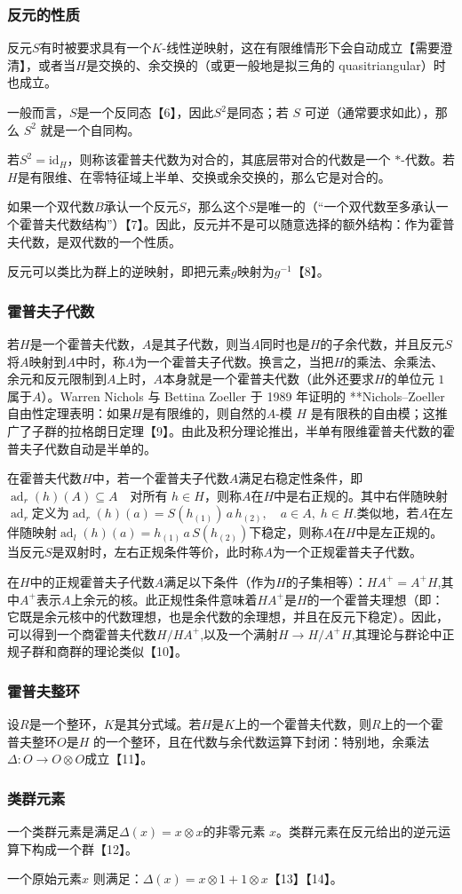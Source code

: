 \subsubsection{反元的性质}
反元$S$有时被要求具有一个$K$-线性逆映射，这在有限维情形下会自动成立【需要澄清】，或者当$H$是交换的、余交换的（或更一般地是拟三角的 quasitriangular）时也成立。

一般而言，$S$是一个反同态【6】，因此$S^2$是同态；若 $S$ 可逆（通常要求如此），那么 $S^2$ 就是一个自同构。

若$S^2 = \mathrm{id}_H$，则称该霍普夫代数为对合的，其底层带对合的代数是一个 $*$-代数。若$H$是有限维、在零特征域上半单、交换或余交换的，那么它是对合的。

如果一个双代数$B$承认一个反元$S$，那么这个$S$是唯一的（“一个双代数至多承认一个霍普夫代数结构”）【7】。因此，反元并不是可以随意选择的额外结构：作为霍普夫代数，是双代数的一个性质。

反元可以类比为群上的逆映射，即把元素$g$映射为$g^{-1}$【8】。
\subsubsection{霍普夫子代数}
若$H$是一个霍普夫代数，$A$是其子代数，则当$A$同时也是$H$的子余代数，并且反元$S$将$A$映射到$A$中时，称$A$为一个霍普夫子代数。换言之，当把$H$的乘法、余乘法、余元和反元限制到$A$上时，$A$本身就是一个霍普夫代数（此外还要求$H$的单位元 $1$属于$A$）。Warren Nichols 与 Bettina Zoeller 于 1989 年证明的 **Nichols–Zoeller 自由性定理表明：如果$H$是有限维的，则自然的$A$-模 $H$ 是有限秩的自由模；这推广了子群的拉格朗日定理【9】。由此及积分理论推出，半单有限维霍普夫代数的霍普夫子代数自动是半单的。

在霍普夫代数$H$中，若一个霍普夫子代数$A$满足右稳定性条件，即$\operatorname{ad}_r(h)(A) \subseteq A \quad \text{对所有 } h \in H$，则称$A$在$H$中是右正规的。其中右伴随映射$\operatorname{ad}_r$定义为$\operatorname{ad}_r(h)(a) = S(h_{(1)})\, a \, h_{(2)}, \quad a \in A, \; h \in H$.类似地，若$A$在左伴随映射$\operatorname{ad}_l(h)(a) = h_{(1)}\, a \, S(h_{(2)})$下稳定，则称$A$在$H$中是左正规的。当反元$S$是双射时，左右正规条件等价，此时称$A$为一个正规霍普夫子代数。

在$H$中的正规霍普夫子代数$A$满足以下条件（作为$H$的子集相等）：$H A^{+} = A^{+} H$,其中$A^{+}$表示$A$上余元的核。此正规性条件意味着$H A^{+}$是$H$的一个霍普夫理想（即：它既是余元核中的代数理想，也是余代数的余理想，并且在反元下稳定）。因此，可以得到一个商霍普夫代数$H / H A^{+}$,以及一个满射$H \to H / A^{+} H$,其理论与群论中正规子群和商群的理论类似【10】。
\subsubsection{霍普夫整环}
设$R$是一个整环，$K$是其分式域。若$H$是$K$上的一个霍普夫代数，则$R$上的一个霍普夫整环$O$是$H$ 的一个整环，且在代数与余代数运算下封闭：特别地，余乘法$\Delta : O \to O \otimes O$成立【11】。
\subsubsection{类群元素}
一个类群元素是满足$\Delta(x) = x \otimes x$的非零元素 $x$。类群元素在反元给出的逆元运算下构成一个群【12】。

一个原始元素$x$ 则满足：$\Delta(x) = x \otimes 1 + 1 \otimes x$【13】【14】。 
